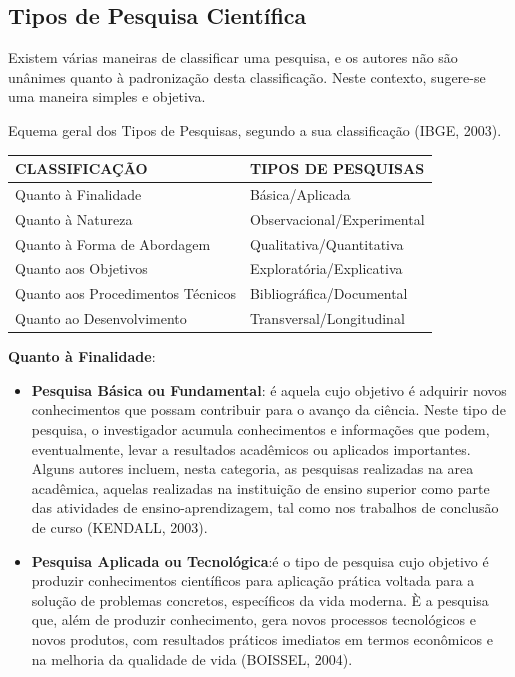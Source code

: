 \newpage
\subsection{Tipos de Pesquisa Científica}

\inic Existem várias maneiras de classificar uma pesquisa, e os autores não são unânimes quanto à padronização desta classificação. Neste contexto, sugere-se uma maneira simples e objetiva.\vskip0.3cm 

\begin{quadro}[h!tp]
    \centering
    \caption{Equema geral dos Tipos de Pesquisas, segundo a sua classificação (IBGE, 2003).}
    \begin{tabular}{|l|l|}
    \hline \hline
    CLASSIFICAÇÃO                & TIPOS DE PESQUISAS   \\    
    \hline\hline
     Quanto à Finalidade         & Básica/Aplicada \\
     \hline
     Quanto à Natureza           & Observacional/Experimental  \\
     \hline
    Quanto à Forma de Abordagem  & Qualitativa/Quantitativa \\
    \hline
     Quanto aos Objetivos        & Exploratória/Explicativa \\
     \hline
    Quanto aos Procedimentos Técnicos     & Bibliográfica/Documental             \\
       \hline     
    Quanto ao Desenvolvimento    & Transversal/Longitudinal              \\
  \hline\hline
    \end{tabular}
\end{quadro}






\textbf{Quanto à Finalidade}: 

\begin{itemize}
\item \textbf{Pesquisa Básica ou Fundamental}: é aquela cujo objetivo é adquirir novos conhecimentos que possam contribuir para o avanço da ciência. Neste tipo de pesquisa, o investigador acumula conhecimentos e informações que podem, eventualmente, levar a resultados acadêmicos ou aplicados importantes. Alguns autores incluem, nesta categoria, as pesquisas realizadas na area acadêmica, aquelas realizadas na instituição de ensino superior como parte das atividades de ensino-aprendizagem, tal como nos trabalhos de conclusão de curso (KENDALL, 2003). 
\item \textbf{Pesquisa Aplicada ou Tecnológica}:é o tipo de pesquisa cujo objetivo é produzir conhecimentos científicos para aplicação prática voltada para a solução de problemas concretos, específicos da vida moderna. È a pesquisa que, além de produzir conhecimento, gera novos processos tecnológicos e novos produtos, com resultados práticos imediatos em termos econômicos e na melhoria da qualidade de vida (BOISSEL, 2004).
\end{itemize}


